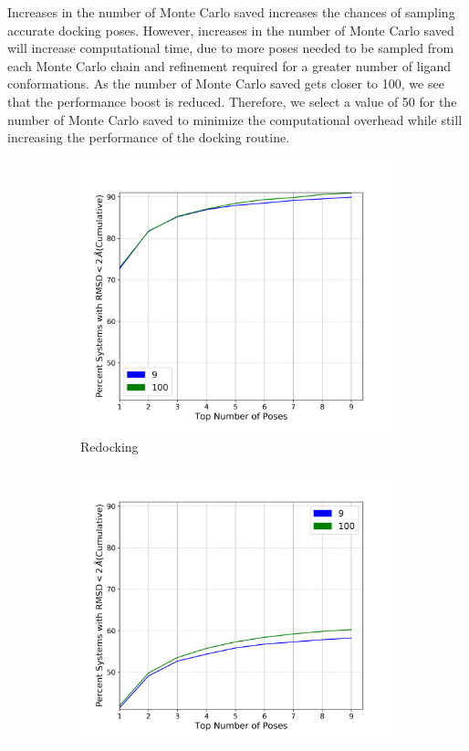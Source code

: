 \documentclass[journal=jcisd8,manuscript=article]{achemso}
\begin{document}
Increases in the number of Monte Carlo saved increases the chances of sampling accurate docking poses. However, increases in the number of Monte Carlo saved will increase computational time, due to more poses needed to be sampled from each Monte Carlo chain and refinement required for a greater number of ligand conformations. As the number of Monte Carlo saved gets closer to 100, we see that the performance boost is reduced. Therefore, we select a value of 50 for the number of Monte Carlo saved to minimize the computational overhead while still increasing the performance of the docking routine.  

\begin{figure}    
        \begin{subfigure}[b]{0.48\textwidth}    
		\centering
		\includegraphics[width=\textwidth]{figures/redocking/sweep_num_modes_line.png}
		\caption{Redocking}
		\label{fig:num modes rd}
        \end{subfigure}    
        \begin{subfigure}[b]{0.48\textwidth}    
		\centering
		\includegraphics[width=\textwidth]{figures/crossdocking/sweep_num_modes_line.png}

\end{subfigure}
\end{figure}
\end{document}
